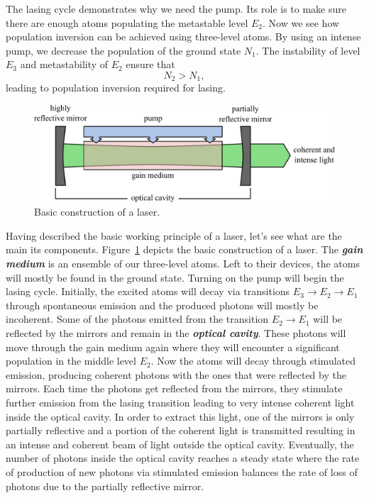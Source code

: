 The lasing cycle demonstrates why we need the pump.
Its role is to make sure there are enough atoms populating the metastable level $E_2$.
Now we see how population inversion can be achieved using three-level atoms.
By using an intense pump, we decrease the population of the ground state $N_1$.
The instability of level $E_3$ and metastability of $E_2$ ensure that
\begin{equation}
    N_2 > N_1,
\end{equation}
leading to population inversion required for lasing.

\begin{figure}[t]
    \centering
    \includegraphics[width=\textwidth]{lesson5/5-4_laser_construction.pdf}
    \caption[Laser construction.]{Basic construction of a laser.}
    \label{fig:5-4_laser_construction}
\end{figure}

Having described the basic working principle of a laser, let's see what are the main its components.
Figure~\ref{fig:5-4_laser_construction} depicts the basic construction of a laser.
The \textbf{\emph{gain medium}} is an ensemble of our three-level atoms.
Left to their devices, the atoms will mostly be found in the ground state.
Turning on the pump will begin the lasing cycle.
Initially, the excited atoms will decay via transitions $E_3 \rightarrow E_2 \rightarrow E_1$ through spontaneous emission and the produced photons will mostly be incoherent.
Some of the photons emitted from the transition $E_2 \rightarrow E_1$ will be reflected by the mirrors and remain in the \textbf{\emph{optical cavity}}.
These photons will move through the gain medium again where they will encounter a significant population in the middle level $E_2$.
Now the atoms will decay through stimulated emission, producing coherent photons with the ones that were reflected by the mirrors.
Each time the photons get reflected from the mirrors, they stimulate further emission from the lasing transition leading to very intense coherent light inside the optical cavity.
In order to extract this light, one of the mirrors is only partially reflective and a portion of the coherent light is transmitted resulting in an intense and coherent beam of light outside the optical cavity.
Eventually, the number of photons inside the optical cavity reaches a steady state where the rate of production of new photons via stimulated emission balances the rate of loss of photons due to the partially reflective mirror.

